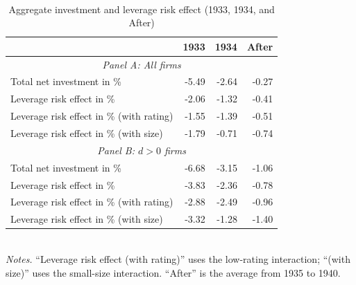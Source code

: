\begin{table}[p]\centering
\caption{\\Aggregate investment and leverage risk effect (1933, 1934, and After)}\footnotesize
\label{tab:agg}
\begin{tabular}{lrrr}
\toprule
& 1933 & 1934 & After \\
\midrule
\multicolumn{4}{c}{\textit{Panel A: All firms}}\\
\midrule
Total net investment in \%                 & -5.49 & -2.64 & -0.27 \\
Leverage risk effect in \%                 & -2.06 & -1.32 & -0.41 \\
Leverage risk effect in \% (with rating)   & -1.55 & -1.39 & -0.51 \\
Leverage risk effect in \% (with size)     & -1.79 & -0.71 & -0.74 \\
\midrule
\multicolumn{4}{c}{\textit{Panel B: $d>0$ firms}}\\
\midrule
Total net investment in \%                  & -6.68 & -3.15 & -1.06 \\
Leverage risk effect in \%                 & -3.83 & -2.36 & -0.78 \\
Leverage risk effect in \% (with rating)   & -2.88 & -2.49 & -0.96 \\
Leverage risk effect in \% (with size)     & -3.32 & -1.28 & -1.40 \\
\bottomrule
\end{tabular}\\
\vspace*{3mm}\justifying\noindent
\footnotesize{\textit{Notes.} “Leverage risk effect (with rating)” uses the low-rating interaction; “(with size)” uses the small-size interaction. “After” is the average from 1935 to 1940.}
\end{table}







